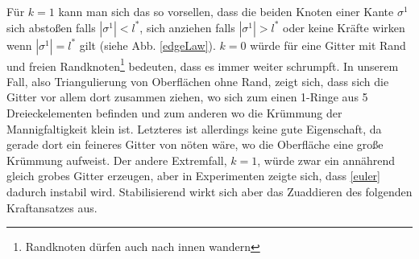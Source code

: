     Für \( k=1 \) kann man sich das so vorsellen, dass die beiden Knoten einer Kante \( \sigma^{1} \) sich abstoßen falls \( |\sigma^{1}| < l^{*}
    \), sich anziehen falls \( |\sigma^{1}| > l^{*}\) oder keine Kräfte wirken wenn \( |\sigma^{1}| = l^{*}\) gilt (siehe Abb. \ref{edgeLaw}).
    \( k = 0 \) würde für eine Gitter mit Rand und freien Randknoten\footnote{Randknoten dürfen auch nach innen wandern} bedeuten, 
    dass es immer weiter schrumpft. In unserem Fall, also Triangulierung von Oberflächen ohne Rand, zeigt sich, dass sich die Gitter vor allem dort
    zusammen ziehen, wo sich zum einen 1-Ringe aus 5 Dreieckelementen befinden und zum anderen wo die Krümmung der Mannigfaltigkeit klein ist.
    Letzteres ist allerdings keine gute Eigenschaft, da gerade dort ein feineres Gitter von nöten wäre, wo die Oberfläche eine große Krümmung
    aufweist.
    Der andere Extremfall, \( k=1 \), würde zwar ein annährend gleich grobes Gitter erzeugen, aber in Experimenten zeigte sich, dass \eqref{euler}
    dadurch instabil wird. Stabilisierend wirkt sich aber das Zuaddieren des folgenden Kraftansatzes aus.
